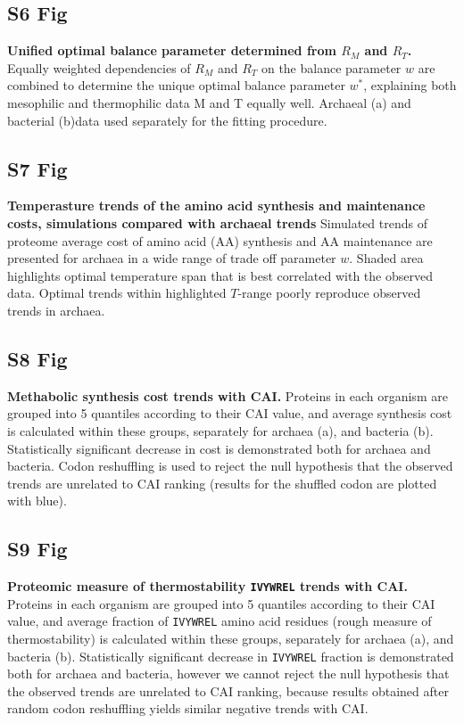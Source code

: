 \documentclass[10pt,letterpaper]{article}
\begin{document}
\subsection*{S6 Fig}
\label{fig:s6}
{\bf Unified optimal balance parameter determined from $R_M$ and $R_T$.}
Equally weighted dependencies of $R_M$ and $R_T$ on the balance parameter $w$ are combined to determine the unique optimal balance parameter $w^*$, explaining both mesophilic and thermophilic data M and T equally well. Archaeal (a) and bacterial (b)data used separately for the fitting procedure.


\subsection*{S7 Fig}
\label{fig:s7}
{\bf Temperasture trends of the amino acid synthesis and maintenance costs, simulations compared with archaeal trends}
Simulated trends of proteome average cost of amino acid (AA) synthesis and AA maintenance are presented for archaea in a wide range of trade off parameter $w$. Shaded area highlights optimal temperature span that is best correlated with the observed data. Optimal trends within highlighted $T$-range poorly reproduce observed trends in archaea.


\subsection*{S8 Fig}
\label{fig:s8}
{\bf Methabolic synthesis cost trends with CAI.}
Proteins in each organism are grouped into 5 quantiles according to their CAI value, and average synthesis cost is calculated within these groups, separately for archaea (a), and bacteria (b). Statistically significant decrease in cost is demonstrated both for archaea and bacteria. Codon reshuffling is used to reject the null hypothesis that the observed trends are unrelated to CAI ranking (results for the shuffled codon are plotted with blue).


\subsection*{S9 Fig}
\label{fig:s9}
{\bf Proteomic measure of thermostability \texttt{IVYWREL} trends with CAI.}
Proteins in each organism are grouped into 5 quantiles according to their CAI value, and average fraction of \texttt{IVYWREL} amino acid residues (rough measure of thermostability) is calculated within these groups, separately for archaea (a), and bacteria (b). Statistically significant decrease in \texttt{IVYWREL} fraction is demonstrated both for archaea and bacteria, however we cannot reject the null hypothesis that the observed trends are unrelated to CAI ranking, because results obtained after random codon reshuffling yields similar negative trends with CAI.
\end{document}
